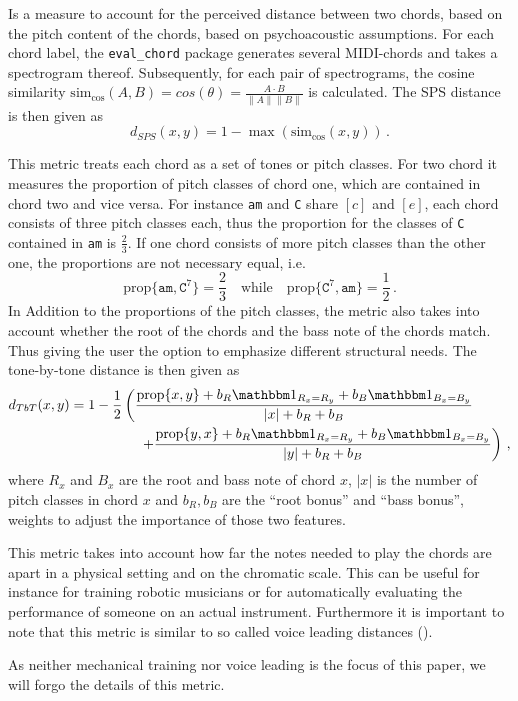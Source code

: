 \begin{description}[font=\normalfont\itshape]
  \item [Spectral Pitch Similarity (SPS)] Is a measure to account for the perceived distance between two chords, based on the pitch content of the chords, based on psychoacoustic assumptions.
    For each chord label, the \texttt{eval\_chord} package generates several MIDI-chords and takes a spectrogram thereof. Subsequently, for each pair of spectrograms, the cosine similarity $\mathrm{sim}_{\cos}(A, B) = cos(\theta) = \frac{A \cdot B}{\|A\| \|B\|}$ is calculated. The SPS distance is then given as
    \[
          d_{SPS}(x, y) = 1 - \max \left( \mathrm{sim}_{\cos} (x, y) \right)\,.
    \]
  \item [Tone-by-Tone Distance] This metric treats each chord as a set of tones or pitch classes. For two chord it measures the proportion of pitch classes of chord one, which are contained in chord two and vice versa. For instance \texttt{am} and \texttt{C} share $ [c] $ and $ [e] $, each chord consists of three pitch classes each, thus the proportion for the classes of \texttt{C} contained in \texttt{am} is $ \frac{2}{3} $. If one chord consists of more pitch classes than the other one, the proportions are not necessary equal, i.e. 
    \[
         \mathrm{prop}\{ \mathtt{am}, \mathtt{C}^{7} \} = \frac{2}{3} \quad \text{while} \quad \mathrm{prop}\{ \mathtt{C}^{7}, \mathtt{am} \} = \frac{1}{2}\,.
    \]
In Addition to the proportions of the pitch classes, the metric also takes into account whether the root of the chords and the bass note of the chords match. Thus giving the user the option to emphasize different structural needs.
    The tone-by-tone distance is then given as
    \begin{align*}
      d_{TbT}(x, y) &= 1 - \frac{1}{2}\left( \frac{\mathrm{prop}\{x, y\} + b_R\indicator_{R_x = R_y} + b_B\indicator_{B_x = B_y}}{|x| + b_R + b_B}\right.\\ 
                    & \hspace{5em}\left. + \frac{\mathrm{prop}\{y, x\} + b_R\indicator_{R_x = R_y} + b_B\indicator_{B_x = B_y}}{|y| + b_R + b_B}\right)\,,
    \end{align*}
    where $ R_x $ and $ B_x $ are the root and bass note of chord $ x $, $ |x| $ is the number of pitch classes in chord $ x $ and $ b_R, b_B $ are the \enquote{root bonus} and \enquote{bass bonus}, weights to adjust the importance of those two features.
  \item [Mechanical distance] This metric takes into account how far the notes needed to play the chords are apart in a physical setting and on the chromatic scale. This can be useful for instance for training robotic musicians or for automatically evaluating the performance of someone on an actual instrument. Furthermore it is important to note that this metric is similar to so called voice leading distances (\cite{tymoczko2009}).

    As neither mechanical training nor voice leading is the focus of this paper, we will forgo the details of this metric.
\end{description}

